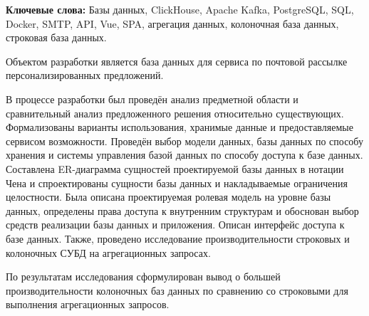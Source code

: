 \begin{essay}{}

\par \textbf{Ключевые слова:} Базы данных, ClickHouse, Apache Kafka, PostgreSQL, SQL, Docker, SMTP, API, Vue, SPA, агрегация данных, колоночная база данных, строковая база данных.

\par Объектом разработки является база данных для сервиса по почтовой рассылке персонализированных предложений.

\par В процессе разработки был проведён анализ предметной области и сравнительный анализ предложенного решения относительно существующих. Формализованы варианты использования, хранимые данные и предоставляемые сервисом возможности. Проведён выбор модели данных, базы данных по способу хранения и системы управления базой данных по способу доступа к базе данных. Составлена ER-диаграмма сущностей проектируемой базы данных в нотации Чена и спроектированы сущности базы данных и накладываемые ограничения целостности. Была описана проектируемая ролевая модель на уровне базы данных, определены права доступа к внутренним структурам и обоснован выбор средств реализации базы данных и приложения. Описан интерфейс доступа к базе данных. Также, проведено исследование производительности строковых и колоночных СУБД на агрегационных запросах.

\par По результатам исследования сформулирован вывод о большей производительности колоночных баз данных по сравнению со строковыми для выполнения агрегационных запросов.

\end{essay}